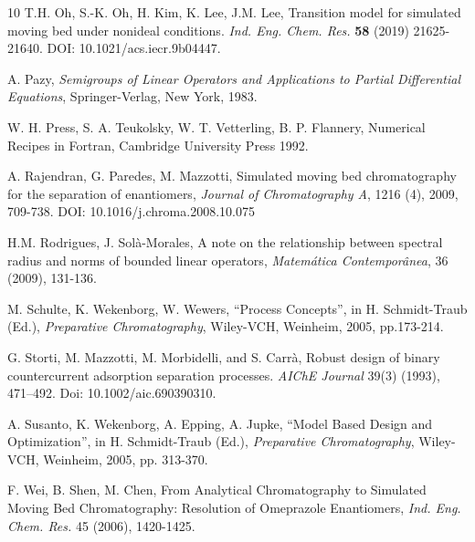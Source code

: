 \documentclass[a4paper]{article}
\numberwithin{equation}{section}
\begin{document}
\begin{thebibliography}{10}
T.H. Oh, S.-K. Oh, H. Kim, K. Lee, J.M. Lee, Transition model for simulated moving bed under nonideal conditions. \textit{Ind. Eng. Chem. Res.} \textbf{58} (2019) 21625-21640. DOI: 10.1021/acs.iecr.9b04447.

A. Pazy, {\it Semigroups of Linear Operators and Applications to Partial Differential Equations}, Springer-Verlag, New York, 1983.

W. H. Press, S. A. Teukolsky, W. T. Vetterling, B. P. Flannery, Numerical Recipes in Fortran, Cambridge University Press 1992.

A. Rajendran, G. Paredes, M. Mazzotti,
Simulated moving bed chromatography for the separation of enantiomers,
\textit{Journal of Chromatography A},
1216 (4), 2009, 709-738.
DOI: 10.1016/j.chroma.2008.10.075

H.M. Rodrigues,  J. Solà-Morales, {A note on the relationship between spectral radius and norms of bounded linear operators}, {\it Matemática Contemporânea}, 36 (2009), 131-136.


M. Schulte, K. Wekenborg, W. Wewers, ``Process Concepts'', in H. Schmidt-Traub (Ed.), {\it Preparative Chromatography}, Wiley-VCH, Weinheim, 2005, pp.173-214.

G. Storti, M. Mazzotti, M. Morbidelli, and S. Carrà,  Robust design of binary countercurrent adsorption separation processes. {\it AIChE Journal} 39(3) (1993), 471–492. Doi: 10.1002/aic.690390310.

A. Susanto, K. Wekenborg, A. Epping, A. Jupke, ``Model Based Design and Optimization'', in H. Schmidt-Traub (Ed.), {\it Preparative Chromatography}, Wiley-VCH, Weinheim, 2005, pp. 313-370.

F. Wei, B. Shen, M. Chen, From Analytical Chromatography to Simulated Moving Bed Chromatography: Resolution of Omeprazole Enantiomers, {\it Ind. Eng. Chem. Res.} 45 (2006), 1420-1425.
\end{thebibliography}
\end{document}
